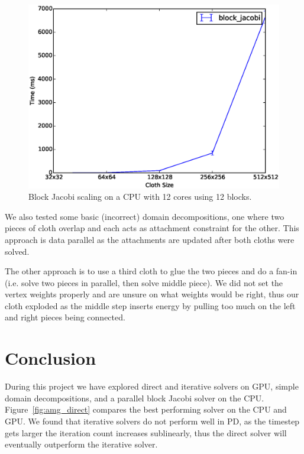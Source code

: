 \documentclass{article}
\begin{document}
\begin{figure}[htb!]
	\centering
	\includegraphics[width=0.9\linewidth]{img/block_jacobi_scaling}
	\caption{Block Jacobi scaling on a CPU with 12 cores using 12 blocks.
	\label{fig:block_jacobi_scaling}}
\end{figure}

We also tested some basic (incorrect) domain decompositions, one where two
pieces of cloth overlap and each acts as attachment constraint for the other.
This approach is data parallel as the attachments are updated after both
cloths were solved.

The other approach is to use a third cloth to glue the two pieces and do a
fan-in (i.e. solve two pieces in parallel, then solve middle piece). We did
not set the vertex weights properly and are unsure on what weights would be right,
thus our cloth exploded as the middle step inserts energy by pulling too much on
the left and right pieces being connected.

\section{Conclusion}
During this project we have explored direct and iterative solvers on GPU,
simple domain decompositions, and a parallel block Jacobi solver on the CPU.
Figure~\ref{fig:amg_direct} compares the best performing solver on the CPU and
GPU. We found that iterative solvers do not perform well in PD, as the
timestep gets larger the iteration count increases sublinearly, thus the
direct solver will eventually outperform the iterative solver.
\end{document}

